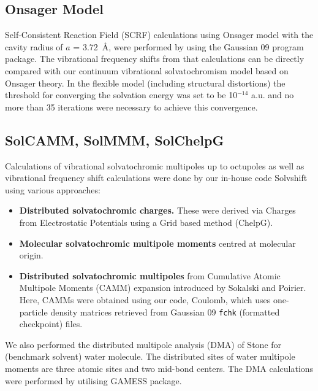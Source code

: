 \documentclass[a4paper,titlepage,twoside,fleqn,12pt]{book}
\begin{document}
\begin{appendices}
\begin{refsection}
\subsection{Onsager Model}

Self\hyp{}Consistent Reaction Field (SCRF) calculations
using Onsager model \citep{Kirkwood.JCP.1934,Onsager.JACS.1936,
Wong.Frisch.Wiberg.JACS.1991,Wong.Wiberg.Frisch.JCP.1991,
Wong.Wiberg.Frisch.JACS.1992}
%
with the cavity radius of
$a$ = 3.72~\AA, were performed by using the {\sc Gaussian 09} program package. \citep{Frisch.Gaussian.2009}
The vibrational frequency shifts from that calculations can be directly
compared with our continuum vibrational solvatochromism model
based on Onsager theory. In the flexible model (including structural
distortions) the threshold for converging the solvation energy
was set to be 10$^{-14}$ a.u. and no more than 35 iterations were necessary
to achieve this convergence.


\subsection{SolCAMM, SolMMM, SolChelpG}

Calculations
of vibrational solvatochromic multipoles up to octupoles as
well as vibrational frequency shift calculations were done by
our in\hyp{}house code {\sc Solvshift} using various approaches:
%
\begin{itemize}
\item {\bf Distributed solvatochromic charges.} These were derived
via Charges from Electrostatic Potentials using a Grid
based method (ChelpG). \citep{Breneman.Wiberg.JCC.1990}
\item {\bf Molecular solvatochromic multipole moments}
centred at molecular origin. \citep{Lee.Choi.Cho.JCP.2012}
\item {\bf Distributed solvatochromic multipoles} from Cumulative
Atomic Multipole Moments (CAMM) expansion introduced
by Sokalski and Poirier. \citep{Sokalski.Poirier.CPL.1983}
Here, CAMMs were obtained using our code,
{\sc Coulomb}, which uses one\hyp{}particle density matrices retrieved
from {\sc Gaussian 09} \verb+fchk+ (formatted checkpoint)
files. 
\end{itemize}
%
We also performed the
distributed multipole analysis (DMA) of Stone \citep{Sokalski.Poirier.CPL.1983} 
for (benchmark
solvent) water molecule. The distributed sites of water
multipole moments are three atomic sites and two mid\hyp{}bond
centers. The DMA calculations were performed by utilising
GAMESS package. \citep{GAMESS.JCC.1993}


\end{refsection}
\end{appendices}
\end{document}
